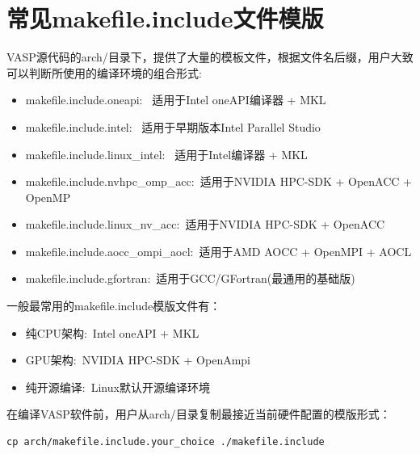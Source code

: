 \section{常见\rm{makefile.include}文件模版}
\textrm{VASP}源代码的\textrm{arch/}目录下，提供了大量的模板文件，根据文件名后缀，用户大致可以判断所使用的编译环境的组合形式:
\begin{itemize}
	\item \textrm{makefile.include.oneapi}:~ 适用于\textrm{Intel oneAPI}编译器 + \textrm{MKL}
	\item \textrm{makefile.include.intel}:~ 适用于早期版本\textrm{Intel Parallel Studio}
	\item \textrm{makefile.include.linux\_intel}:~ 适用于\textrm{Intel}编译器 + \textrm{MKL}
	\item \textrm{makefile.include.nvhpc\_omp\_acc}:~适用于\textrm{NVIDIA HPC-SDK} + \textrm{OpenACC} + \textrm{OpenMP}
	\item \textrm{makefile.include.linux\_nv\_acc}:~适用于\textrm{NVIDIA HPC-SDK} + \textrm{OpenACC}
	\item \textrm{makefile.include.aocc\_ompi\_aocl}:~适用于\textrm{AMD AOCC} + \textrm{OpenMPI} + \textrm{AOCL}
	\item \textrm{makefile.include.gfortran}:~适用于\textrm{GCC/GFortran}(最通用的基础版)
\end{itemize}
一般最常用的\textrm{makefile.include}模版文件有：
\begin{itemize}
\item 纯\textrm{CPU}架构:~\textrm{Intel oneAPI + MKL}
{\fontsize{8.2pt}{6.2pt}\selectfont{
}}
	\item \textrm{GPU}架构:~\textrm{NVIDIA HPC-SDK + OpenAmpi}
{\fontsize{8.2pt}{6.2pt}\selectfont{
}}
\item 纯开源编译:~\textrm{Linux}默认开源编译环境
{\fontsize{8.2pt}{6.2pt}\selectfont{
}}
\end{itemize}
%
在编译\textrm{VASP}软件前，用户从\textrm{arch/}目录复制最接近当前硬件配置的模版形式：
%
%
\begin{verbatim}
cp arch/makefile.include.your_choice ./makefile.include
\end{verbatim}

